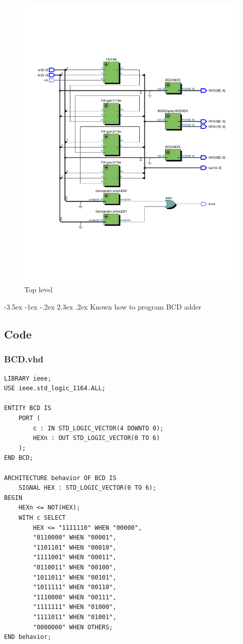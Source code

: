 \documentclass[13pt,a4paper]{report}
\makeatletter
\renewcommand\section{\@startsection {section}{1}{-1em}%
  {-3.5ex \@plus -1ex \@minus -.2ex}%
  {2.3ex \@plus.2ex}%
  {\normalfont\Large\bfseries}}
\makeatother
\begin{document}
\begin{figure}[H]
\centering
\includegraphics[scale=0.7, clip, trim={0cm 5cm 0cm 5cm}]{images/Exc2_RTL.pdf}
\caption*{Top level}
\end{figure}

\newpage
\section{Known how to program BCD adder}
\subsection{Code}

\subsubsection{BCD.vhd}
\begin{verbatim}
LIBRARY ieee;
USE ieee.std_logic_1164.ALL;

ENTITY BCD IS
	PORT (
		c : IN STD_LOGIC_VECTOR(4 DOWNTO 0);
		HEXn : OUT STD_LOGIC_VECTOR(0 TO 6)
	);
END BCD;

ARCHITECTURE behavior OF BCD IS
	SIGNAL HEX : STD_LOGIC_VECTOR(0 TO 6);
BEGIN
	HEXn <= NOT(HEX);
	WITH c SELECT
		HEX <= "1111110" WHEN "00000",
		"0110000" WHEN "00001",
		"1101101" WHEN "00010",
		"1111001" WHEN "00011",
		"0110011" WHEN "00100",
		"1011011" WHEN "00101",
		"1011111" WHEN "00110",
		"1110000" WHEN "00111",
		"1111111" WHEN "01000",
		"1111011" WHEN "01001",
		"0000000" WHEN OTHERS;
END behavior;
\end{verbatim}
\end{document}
